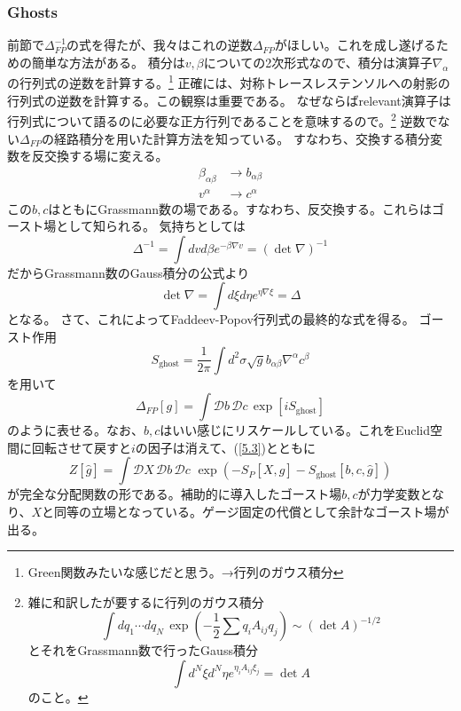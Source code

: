 \documentclass[10pt]{jsarticle}
\newcommand{\kakko}[1]{\left(#1 \right)} %
\newcommand{\sint}[1]{\int\mathcal{D}#1\,}%
\newcommand{\pms}[1]{\mathcal{D}#1\,}%
\begin{document}
\subsubsection{Ghosts}
前節で$\Delta_{FP}^{-1}$の式を得たが、我々はこれの逆数$\Delta_{FP}$がほしい。これを成し遂げるための簡単な方法がある。
積分は$v,\beta$についての2次形式なので、積分は演算子$\nabla_{\alpha}$の行列式の逆数を計算する。\footnote{Green関数みたいな感じだと思う。→行列のガウス積分}
正確には、対称トレースレステンソルへの射影の行列式の逆数を計算する。この観察は重要である。
なぜならばrelevant演算子は行列式について語るのに必要な正方行列であることを意味するので。\footnote{雑に和訳したが要するに行列のガウス積分\begin{equation}  \int dq_{1}\cdots dq_{N}\,\exp\kakko{-\frac{1}{2}\sum q_{i}A_{ij}q_{j}}\sim (\det A)^{-1/2}\end{equation}とそれをGrassmann数で行ったGauss積分\begin{equation} \int d^{N}\xi d^{N}\eta e^{\eta_{i}A_{ij}\xi_{j}}=\det A \end{equation}のこと。}
逆数でない$\Delta_{FP}$の経路積分を用いた計算方法を知っている。
すなわち、交換する積分変数を反交換する場に変える。
\begin{align}
  \beta_{\alpha \beta}& \to b_{\alpha \beta}\\
  v^{\alpha}&\to c^{\alpha}
\end{align}
この$b,c$はともにGrassmann数の場である。すなわち、反交換する。これらはゴースト場として知られる。
気持ちとしては
\begin{equation}
  \Delta^{-1}=\int dv d\beta e^{-\beta \nabla v}=(\det \nabla)^{-1}
\end{equation}
だからGrassmann数のGauss積分の公式より
\begin{equation}
  \det \nabla= \int d\xi d\eta e^{\eta \nabla \xi}=\Delta 
\end{equation}
となる。
さて、これによってFaddeev-Popov行列式の最終的な式を得る。
ゴースト作用
\begin{equation}
  \label{5.5}S_{\mathrm{ghost}}=\frac{1}{2\pi}\int d^{2}\sigma \sqrt{g}b_{\alpha\beta}\nabla^{\alpha}c^{\beta}
\end{equation}
を用いて
\begin{equation}
  \Delta_{FP}[g]=\sint{b}\mathcal{D}c \, \exp[iS_{\mathrm{ghost}}]
\end{equation}
のように表せる。なお、$b,c$はいい感じにリスケールしている。これをEuclid空間に回転させて戻すと$i$の因子は消えて、(\ref{5.3})とともに
\begin{equation}
  Z[\hat{g}]=\sint{X}\pms{b}\pms{c} \, \exp\kakko{-S_{P}[X,\hat{g}]-S_{\mathrm{ghost}}[b,c,\hat{g}]}
\end{equation}
が完全な分配関数の形である。補助的に導入したゴースト場$b,c$が力学変数となり、$X$と同等の立場となっている。ゲージ固定の代償として余計なゴースト場が出る。
\end{document}

